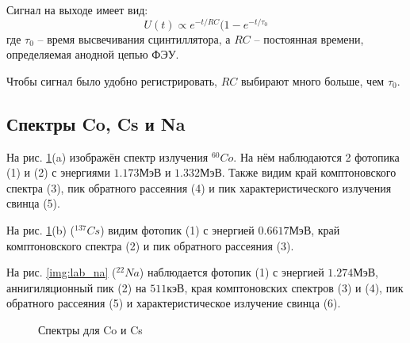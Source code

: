 \documentclass[a4paper, 12pt]{article}
\begin{document}
            Сигнал на выходе имеет вид:
            $$
                U(t) \propto e^{-t/RC}(1 - e^{-t/\tau_0}
            $$
            где $\tau_0$ -- время высвечивания сцинтиллятора, а $RC$ -- постоянная времени, определяемая анодной цепью ФЭУ.

            Чтобы сигнал было удобно регистрировать, $RC$ выбирают много больше, чем $\tau_0$.

        \subsection{Спектры Co, Cs и Na}

            На рис. \ref{img:lab_co_cs}(a) изображён спектр излучения $^{60}Co$. На нём наблюдаются 2 фотопика (1) и (2) с энергиями $1.173 МэВ$ и $1.332 МэВ$. Также видим край комптоновского спектра (3), пик обратного рассеяния (4) и пик характеристического излучения свинца (5).

            На рис. \ref{img:lab_co_cs}(b) ($^{137}Cs$) видим фотопик (1) с энергией $0.6617 МэВ$, край комптоновского спектра (2) и пик обратного рассеяния (3).

            На рис. \ref{img:lab_na} ($^{22}Na$) наблюдается фотопик (1) с энергией $1.274 МэВ$, аннигиляционный пик (2) на $511 кэВ$, края комптоновских спектров (3) и (4), пик обратного рассеяния (5) и характеристическое излучение свинца (6).

            \begin{figure}[ht!]
                \centering
                \qquad
                \caption{Спектры для Co и Cs}%
                \label{img:lab_co_cs}%
            \end{figure}
\end{document}
